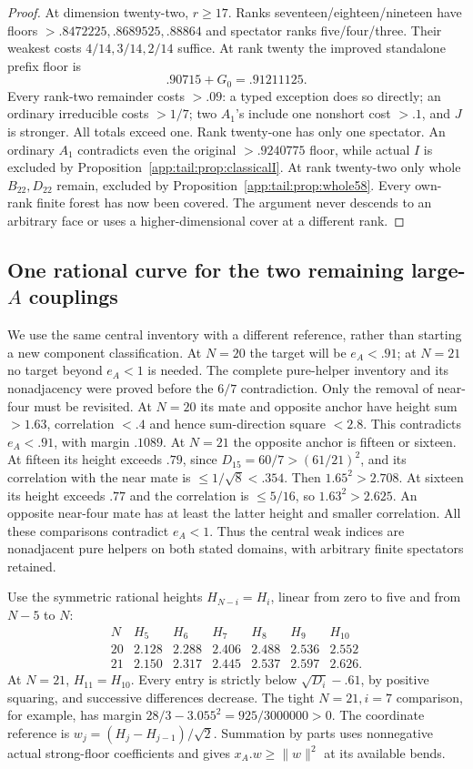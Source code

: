 \documentclass[11pt]{article}
\theoremstyle{definition}
\theoremstyle{remark}
\newcommand{\norm}[1]{\lVert #1\rVert}
\begin{document}
\begin{proof}
At dimension twenty-two, $r\ge17$. Ranks seventeen/eighteen/nineteen
have floors $>.8472225,\allowbreak .8689525,\allowbreak .88864$ and spectator ranks
five/four/three. Their weakest costs $4/14,\allowbreak 3/14,\allowbreak 2/14$ suffice.
At rank twenty the improved standalone prefix floor is
\[
 .90715+G_0=.91211125.
\]
Every rank-two remainder costs $>.09$: a typed exception does so
directly; an ordinary irreducible costs $>1/7$; two $A_1$'s include
one nonshort cost $>.1$, and $J$ is stronger. All totals exceed one.
Rank twenty-one has only one spectator. An ordinary $A_1$ contradicts
even the original $>.9240775$ floor, while actual $I$ is excluded
by Proposition~\ref{app:tail:prop:classicalI}. At rank twenty-two
only whole $B_{22},D_{22}$ remain, excluded by
Proposition~\ref{app:tail:prop:whole58}. Every own-rank finite forest
has now been covered. The argument never descends to an arbitrary
face or uses a higher-dimensional cover at a different rank.
\end{proof}

\subsection[One rational curve for the two remaining large-A couplings]{One rational curve for the two remaining large-$A$ couplings}
\label{app:tail:Atwoends}
We use the same central inventory with a different reference, rather
than starting a new component classification. At $N=20$ the target
will be $e_A<.91$; at $N=21$ no target beyond $e_A<1$ is needed.
The complete pure-helper inventory and its nonadjacency were proved
before the $6/7$ contradiction. Only the removal of near-four must
be revisited. At $N=20$ its mate and opposite anchor have height
sum $>1.63$, correlation $<.4$ and hence sum-direction square
$<2.8$. This contradicts $e_A<.91$, with margin $.1089$.
At $N=21$ the opposite anchor is fifteen or sixteen. At fifteen its
height exceeds $.79$, since $D_{15}=60/7>(61/21)^2$, and its
correlation with the near mate is $\le1/\sqrt8<.354$.
Then $1.65^2>2.708$. At sixteen its height exceeds $.77$ and
the correlation is $\le5/16$, so $1.63^2>2.625$.
An opposite near-four mate has at least the latter height and smaller
correlation. All these comparisons contradict $e_A<1$.
Thus the central weak indices are nonadjacent pure helpers on both
stated domains, with arbitrary finite spectators retained.

Use the symmetric rational heights $H_{N-i}=H_i$, linear from
zero to five and from $N-5$ to $N$:
\[
\begin{array}{c|rrrrrr}
N&H_5&H_6&H_7&H_8&H_9&H_{10}\\\hline
20&2.128&2.288&2.406&2.488&2.536&2.552\\
21&2.150&2.317&2.445&2.537&2.597&2.626 .
\end{array}
\]
At $N=21$, $H_{11}=H_{10}$. Every entry is strictly below
$\sqrt{D_i}-.61$, by positive squaring, and successive differences
decrease. The tight $N=21,i=7$ comparison, for example, has
margin $28/3-3.055^2=925/3000000>0$.
The coordinate reference is $w_j=(H_j-H_{j-1})/\sqrt2$.
Summation by parts uses nonnegative actual strong-floor coefficients
and gives $x_A.w\ge\norm w^2$ at its available bends.
\end{document}
